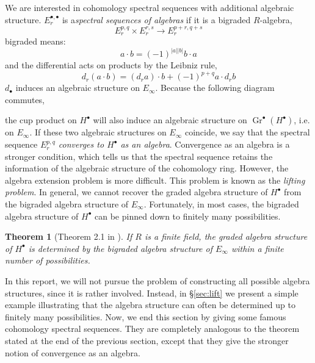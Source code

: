 \documentclass[a4paper,11pt]{article}
\newtheorem{theorem}{Theorem}[section]
\theoremstyle{definition}
\theoremstyle{remark}
\begin{document}
We are interested in cohomology spectral sequences with additional algebraic structure. $E^{\bullet,\bullet}_r$ is a{\itshape spectral sequences of algebras} if it is a bigraded $R$-algebra,
\[
E_r^{p,q}\times E_r^{r,s}\to E_r^{p+r,q+s}
\]
bigraded means:
\begin{equation}
	\label{grad}
	a\cdot b= (-1)^{|a||b|} b\cdot a
\end{equation}
and the differential acts on products by the Leibniz rule,
\begin{equation}
	\label{leib}
    d_r(a\cdot b)=(d_ra)\cdot b+(-1)^{p+q}a\cdot d_rb
\end{equation}
$d_\bullet$ induces an algebraic structure on $E_\infty$. Because the following diagram commutes, 
\begin{center}
\end{center}
the cup product on $H^\bullet$ will also induce an algebraic structure on $\operatorname{Gr}^\bullet(H^\bullet)$, i.e. on $E_\infty$. If these two algebraic structures on $E_{\infty}$ coincide, we say that the spectral sequence {\itshape $E^{p,q}_r$ converges to $H^\bullet$ as an algebra}. Convergence as an algebra is a stronger condition, which tells us that the spectral sequence retains the information of the algebraic structure of the cohomology ring. However, the algebra extension problem is more difficult. This problem is known as the {\itshape lifting problem}. In general, we cannot recover the graded algebra structure of $H^\bullet$ from the bigraded algebra structure of $E_\infty$. Fortunately, in most cases, the bigraded algebra structure of $H^\bullet$ can be pinned down to finitely many possibilities.

\begin{theorem}
	[Theorem 2.1 in \cite{carlson2005coclass}] If $R$ is a finite field, the graded algebra structure of $H^{\bullet}$ is determined by the bigraded algebra structure of $E_\infty$ within a finite number of possibilities.
\end{theorem}

In this report, we will not pursue the problem of constructing all possible algebra structures, since it is rather involved. Instead, in \S\ref{sec:lift} we present a simple example illustrating that the algebra structure can often be determined up to finitely many possibilities. Now, we end this section by giving some famous cohomology spectral sequences. They are completely analogous to the theorem stated at the end of the previous section, except that they give the stronger notion of convergence as an algebra.
\end{document}
